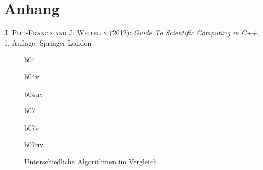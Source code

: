 \documentclass[12pt,a4paper,titlepage,headinclude,bibtotoc]{scrartcl}
\begin{document}
\section*{Anhang}
\begin{thebibliography}{1000}

	\textsc{J. Pitt-Francis and J. Whiteley} (2012): \emph{Guide To Scientific Computing in C++},
	1. Auflage, Springer London

\end{thebibliography}



\begin{figure}
\centering

\caption{b04}\label{b04u1v1}
\end{figure}
\begin{figure}
\centering

\caption{b04v}\label{b04u1v1v}
\end{figure}
\begin{figure}
\centering

\caption{b04uv}\label{b04u1v1uv}
\end{figure}
\begin{figure}
\centering

\caption{b07\label{b07u1v1}}
\end{figure}
\begin{figure}
\centering

\caption{b07v\label{b07u1v1v}}
\end{figure}
\begin{figure}
\centering

\caption{b07uv}\label{b07u1v1uv}
\end{figure}
\begin{figure}
  \centering
   \hfill
   \caption{Unterschiedliche Algorithmen im Vergleich}
   \label{fig:stabi}
 \end{figure}
 
 
\end{document}
